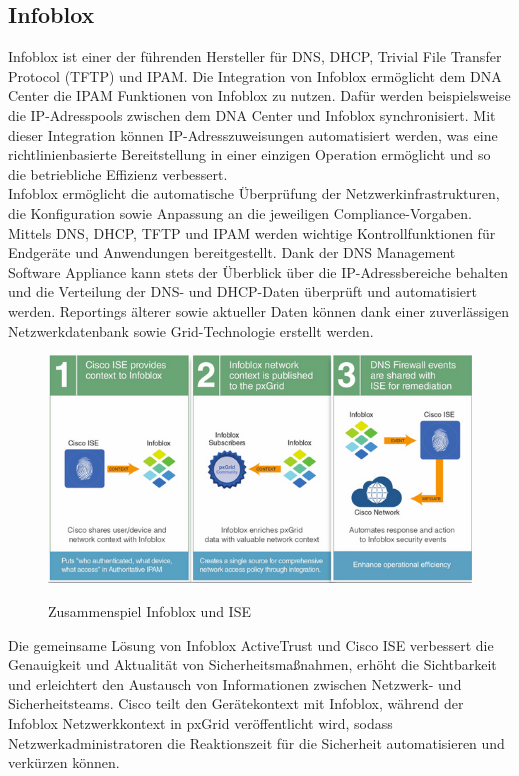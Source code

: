 \subsection{Infoblox}
Infoblox ist einer der führenden Hersteller für DNS, DHCP, Trivial File Transfer Protocol (TFTP) und IPAM. Die Integration von Infoblox ermöglicht dem DNA Center die IPAM Funktionen von Infoblox zu nutzen. Dafür werden beispielsweise die IP-Adresspools zwischen dem DNA Center und Infoblox synchronisiert. Mit dieser Integration können IP-Adresszuweisungen automatisiert werden, was eine richtlinienbasierte Bereitstellung in einer einzigen Operation ermöglicht und so die betriebliche Effizienz verbessert. \\
Infoblox ermöglicht die automatische Überprüfung der Netzwerkinfrastrukturen, die Konfiguration sowie Anpassung an die jeweiligen Compliance-Vorgaben. Mittels DNS, DHCP, TFTP und IPAM werden wichtige Kontrollfunktionen für Endgeräte und Anwendungen bereitgestellt. Dank der DNS Management Software Appliance kann stets der Überblick über die IP-Adressbereiche behalten und die Verteilung der DNS- und DHCP-Daten überprüft und automatisiert werden. Reportings älterer sowie aktueller Daten können dank einer zuverlässigen Netzwerkdatenbank sowie Grid-Technologie erstellt werden.\cite{infoblox} \\

\begin{figure}[H]
	\centering
	\includegraphics[width=0.7\linewidth]{img/infoblox-ise.png}\\[1px]
	\caption{Zusammenspiel Infoblox und ISE \cite{infoblox-communityblog}}
	\label{fig:Zusammenspiel Infoblox und ISE}
\end{figure}

Die gemeinsame Lösung von Infoblox ActiveTrust und Cisco ISE verbessert die Genauigkeit und Aktualität von Sicherheitsmaßnahmen, erhöht die Sichtbarkeit und erleichtert den Austausch von Informationen zwischen Netzwerk- und Sicherheitsteams. Cisco teilt den Gerätekontext mit Infoblox, während der Infoblox Netzwerkkontext in pxGrid veröffentlicht wird, sodass Netzwerkadministratoren die Reaktionszeit für die Sicherheit automatisieren und verkürzen können.\cite{infoblox-communityblog}



